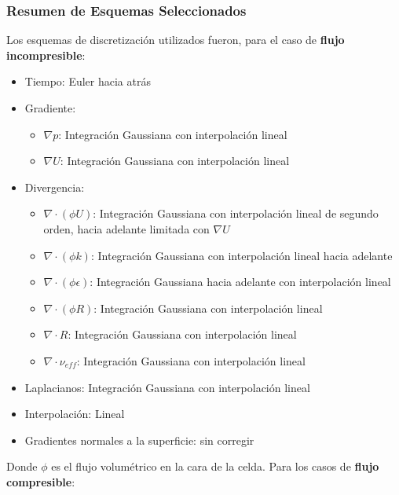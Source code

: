 \subsubsection{Resumen de Esquemas Seleccionados}
%
Los esquemas de discretización utilizados fueron, para el caso de \textbf{flujo
incompresible}:

\begin{itemize}
  \item Tiempo: Euler hacia atrás
  \item Gradiente:
        \begin{itemize}
                \item $\nabla p$: Integración Gaussiana con interpolación lineal
                \item $\nabla U$: Integración Gaussiana con interpolación lineal
        \end{itemize}
  \item Divergencia:
        \begin{itemize}
                \item $\nabla\cdot (\phi U)$: Integración Gaussiana con interpolación lineal de segundo orden, hacia adelante limitada con $\nabla U$
                \item $\nabla\cdot (\phi k)$: Integración Gaussiana con interpolación lineal hacia adelante
                \item $\nabla\cdot (\phi \epsilon)$: Integración Gaussiana hacia adelante con interpolación lineal
                \item $\nabla\cdot (\phi R)$: Integración Gaussiana con interpolación lineal
                \item $\nabla\cdot R$: Integración Gaussiana con interpolación lineal
                \item $\nabla\cdot \nu_{eff}$: Integración Gaussiana con interpolación lineal

        \end{itemize}
  \item Laplacianos: Integración Gaussiana con interpolación lineal
  \item Interpolación: Lineal
  \item Gradientes normales a la superficie: sin corregir
\end{itemize}

Donde $\phi$ es el flujo volumétrico en la cara de la celda.
%
Para los casos de \textbf{flujo compresible}:

